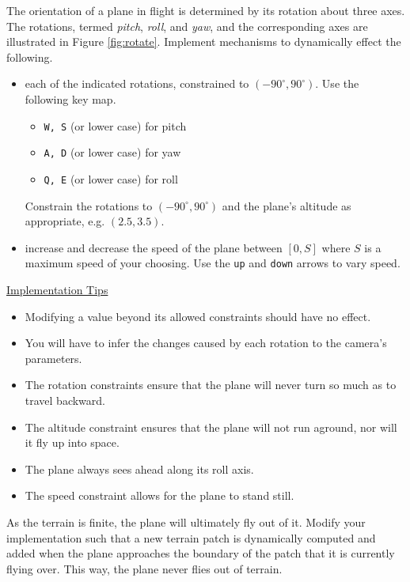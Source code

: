 \documentclass[addpoints]{exam}
\begin{document}
\begin{questions}
  The orientation of a plane in flight is determined by its rotation about three axes. The rotations, termed \textit{pitch}, \textit{roll}, and \textit{yaw}, and the corresponding axes are illustrated in Figure \ref{fig:rotate}. Implement mechanisms to dynamically effect the following.
  \begin{itemize}
  \item each of the indicated rotations, constrained to $(-90^\circ, 90^\circ)$. Use the following key map.
    \begin{itemize}
    \item \texttt{W, S} (or lower case) for pitch
    \item \texttt{A, D} (or lower case) for yaw
    \item \texttt{Q, E} (or lower case) for roll
    \end{itemize}
    Constrain the rotations to $(-90^\circ, 90^\circ)$ and the plane's altitude as appropriate, e.g. $(2.5, 3.5)$.
  \item increase and decrease the speed of the plane between $[0,S]$ where $S$ is a maximum speed of your choosing. Use the \texttt{up} and \texttt{down} arrows to vary speed.
  \end{itemize}

    \noindent\underline{Implementation Tips}
    \begin{itemize}
    \item Modifying a value beyond its allowed constraints should have no effect.
    \item You will have to infer the changes caused by each rotation to the camera's parameters.
    \item The rotation constraints ensure that the plane will never turn so much as to travel backward.
    \item The altitude constraint ensures that the plane will not run aground, nor will it fly up into space.
    \item The plane always sees ahead along its roll axis.
    \item The speed constraint allows for the plane to stand still.
    \end{itemize}

    

    As the terrain is finite, the plane will ultimately fly out of it. Modify your implementation such that a new terrain patch is dynamically computed and added when the plane approaches the boundary of the patch that it is currently flying over. This way, the plane never flies out of terrain.


\end{questions}
\end{document}
